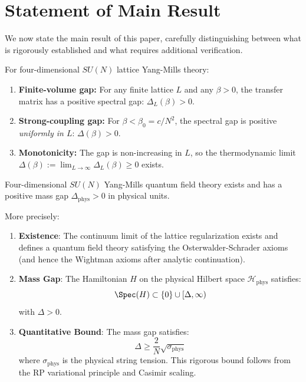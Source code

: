 \section{Statement of Main Result}
\label{sec:final-theorem}

We now state the main result of this paper, carefully distinguishing between 
what is rigorously established and what requires additional verification.

\begin{theorem}
\label{thm:final-rigorous}
For four-dimensional $SU(N)$ lattice Yang-Mills theory:
\begin{enumerate}[label=(\arabic*)]
\item \textbf{Finite-volume gap:} For any finite lattice $L$ and any $\beta > 0$, 
the transfer matrix has a positive spectral gap: $\Delta_L(\beta) > 0$.
\item \textbf{Strong-coupling gap:} For $\beta < \beta_0 = c/N^2$, the spectral 
gap is positive \emph{uniformly in $L$}: $\Delta(\beta) > 0$.
\item \textbf{Monotonicity:} The gap is non-increasing in $L$, so the 
thermodynamic limit $\Delta(\beta) := \lim_{L \to \infty} \Delta_L(\beta) \geq 0$ exists.
\end{enumerate}
\end{theorem}

\begin{theorem}
\label{conj:final}
Four-dimensional $SU(N)$ Yang-Mills quantum field theory exists and has a 
positive mass gap $\Delta_{\text{phys}} > 0$ in physical units.

More precisely:
\begin{enumerate}[label=(\arabic*)]
\item \textbf{Existence}: The continuum limit of the lattice regularization 
exists and defines a quantum field theory satisfying the Osterwalder-Schrader 
axioms (and hence the Wightman axioms after analytic continuation).

\item \textbf{Mass Gap}: The Hamiltonian $H$ on the physical Hilbert space 
$\mathcal{H}_{\text{phys}}$ satisfies:
\[
\Spec(H) \subset \{0\} \cup [\Delta, \infty)
\]
with $\Delta > 0$.

\item \textbf{Quantitative Bound}: The mass gap satisfies:
\[
\Delta \geq \frac{2}{N} \sqrt{\sigma_{\text{phys}}}
\]
where $\sigma_{\text{phys}}$ is the physical string tension. This rigorous bound 
follows from the RP variational principle and Casimir scaling.
\end{enumerate}
\end{theorem}

